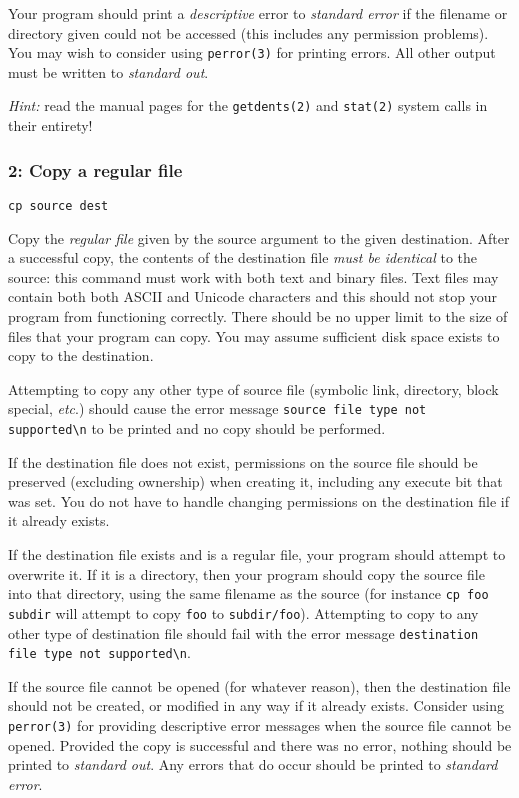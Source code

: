 \documentclass[12pt,a4paper]{article}
\begin{document}
Your program should print a \textit{descriptive} error to \textit{standard
error} if the filename or directory given could not be accessed (this includes
any permission problems). You may wish to consider using \texttt{perror(3)} for 
printing errors. All other output must be written to \textit{standard out}.

\textit{Hint:} read the manual pages for the \texttt{getdents(2)} and
\texttt{stat(2)} system calls in their entirety!

\subsubsection*{2: Copy a regular file}

\texttt{cp source dest}

Copy the \textit{regular file} given by the source argument to the given
destination. After a successful copy, the contents of the destination file
\textit{must be identical} to the source: this command must work with both text
and binary files. Text files may contain both both ASCII and Unicode characters
and this should not stop your program from functioning correctly. There should
be no upper limit to the size of files that your program can copy. You may assume
sufficient disk space exists to copy to the destination.

Attempting to copy any other type of source file (symbolic link, directory,
block special, \textit{etc}.) should cause the error message 
\verb|source file type not supported\n| to be printed and no copy should be performed.

If the destination file does not exist, permissions on the source file should 
be preserved (excluding ownership) when creating it, including any execute bit 
that was set. You do not have to handle changing permissions on the destination file
if it already exists.

If the destination file exists and is a regular file, your program should
attempt to overwrite it. If it is a directory, then your program should copy
the source file into that directory, using the same filename as the source (for instance
\verb|cp foo subdir| will attempt to copy \texttt{foo} to \texttt{subdir/foo}).
Attempting to copy to any other type of destination file should fail with the
error message \verb|destination file type not supported\n|.

If the source file cannot be opened (for whatever reason), then the destination
file should not be created, or modified in any way if it already exists.
Consider using \texttt{perror(3)} for providing descriptive error messages when
the source file cannot be opened.  Provided the copy is successful and there
was no error, nothing should be printed to \textit{standard out}. Any errors
that do occur should be printed to \textit{standard error}.
\end{document}
